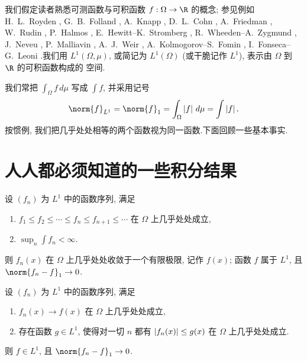 我们假定读者熟悉可测函数与可积函数 $f:\Omega\to\R$ 的概念; 参见例如
H.~L.~Royden , G.~B.~Folland , A.~Knapp , D.~L.~Cohn , A.~Friedman , W.~Rudin , P.~Halmos , E.~Hewitt--K.~Stromberg , R.~Wheeden--A.~Zygmund , J.~Neveu , P.~Malliavin , A.~J.~Weir , A.~Kolmogorov--S.~Fomin , I.~Fonseca--G.~Leoni .我们用 $L^1(\Omega,\mu)$, 或简记为
$L^1(\Omega)$ (或干脆记作 $L^1$), 表示由 $\Omega$ 到 $\R$ 的可积函数构成的
空间.

我们常把 $\int_\Omega f\,d\mu$ 写成 $\int f$, 并采用记号
\begin{equation*}
\norm{f}_{L^1}=\norm{f}_1=\int_\Omega\abs{f}\,d\mu=\int\abs{f}.
\end{equation*}
按惯例, 我们把几乎处处相等的两个函数视为同一函数.下面回顾一些基本事实.

\section{人人都必须知道的一些积分结果}
\label{sec:4.1}

\begin{keytheorem}
\label{thm:4.1}
设 $(f_n)$ 为 $L^1$ 中的函数序列, 满足
\begin{enumerate}[label=(\alph*), leftmargin=2.2em, itemsep=0.1em]
	\item $f_1\le f_2\le\cdots\le f_n\le f_{n+1}\le\cdots$ 在 $\Omega$ 上几乎处处成立,
	\item $\sup_n\int f_n<\infty$.
\end{enumerate}
则 $f_n(x)$ 在 $\Omega$ 上几乎处处收敛于一个有限极限, 记作 $f(x)$; 函数
$f$ 属于 $L^1$, 且 $\norm{f_n-f}_1\to0$.
\end{keytheorem}

\begin{keytheorem}
\label{thm:4.2}
设 $(f_n)$ 为 $L^1$ 中的函数序列, 满足
\begin{enumerate}[label=(\alph*), leftmargin=2.2em, itemsep=0.1em]
	\item $f_n(x)\to f(x)$ 在 $\Omega$ 上几乎处处成立,
	\item 存在函数 $g\in L^1$, 使得对一切 $n$ 都有 $\left|f_n(x)\right|\le g(x)$
	      在 $\Omega$ 上几乎处处成立.
\end{enumerate}
则 $f\in L^1$, 且 $\norm{f_n-f}_1\to0$.
\end{keytheorem}

